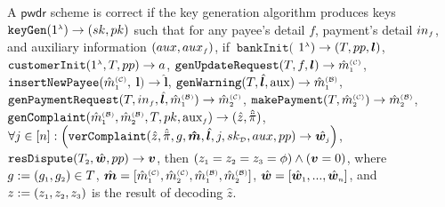 \begin{definition}[Correctness] A $\mathsf{pwdr}$ scheme is correct if the key generation algorithm produces keys $\mathtt{keyGen}(1^{\scriptscriptstyle \lambda})\rightarrow (sk,pk)$ such that for any payee's detail $f$, payment's detail $in_{\scriptscriptstyle f}$, and auxiliary information $(aux, aux_{\scriptscriptstyle f})$, if $\ \mathtt{bankInit}($ $1^{\scriptscriptstyle \lambda})\rightarrow (T, pp, \bm{l})$, $\mathtt{customerInit} (1^{\scriptscriptstyle \lambda}, T, pp)\rightarrow a$, $\mathtt{genUpdateRequest}(T, f, {\bm l})\rightarrow \hat m^{\scriptscriptstyle\mathcal{(C)}}_{\scriptscriptstyle 1}$, $\mathtt{insertNewPayee}(\hat{m}^{\scriptscriptstyle\mathcal{(C)}}_{\scriptscriptstyle 1}, $ ${\bm l})\rightarrow  \hat{\bm l}$, $\mathtt{genWarning}(T, \hat{\bm l}, \text{aux})\rightarrow \hat m^{\scriptscriptstyle\mathcal{(B)}}_{\scriptscriptstyle1}$, $\mathtt{genPaymentRequest}(T, in_{\scriptscriptstyle f}, \hat{\bm{l}}, \hat m^{\scriptscriptstyle\mathcal{(B)}}_{\scriptscriptstyle1})\rightarrow \hat m^{\scriptscriptstyle\mathcal{(C)}}_{\scriptscriptstyle2}$, $\mathtt{makePayment}(T, \hat m^{\scriptscriptstyle\mathcal{(C)}}_{\scriptscriptstyle2})\rightarrow \hat m^{\scriptscriptstyle\mathcal{(B)}}_{\scriptscriptstyle2}$, $\mathtt{genComplaint}(\hat m^{\scriptscriptstyle\mathcal{(B)}}_{\scriptscriptstyle 1}, \hat m^{\scriptscriptstyle\mathcal{(B)}}_{\scriptscriptstyle2}, T, pk, \text{aux}_{\scriptscriptstyle f})\rightarrow (\hat z, \hat{\ddot \pi})$, 
$\forall j\in [n]: \Big(\mathtt{verComplaint}( \hat z, \hat{\ddot{\pi}}, g, \bm{\hat{m}}, \hat{\bm{l}}, j, sk_{\scriptscriptstyle\mathcal D}, aux, pp)\rightarrow \hat{\bm{w}_{\scriptscriptstyle j}}\Big)$, 
 $\mathtt{resDispute}(T_{\scriptscriptstyle 2}, \hat {\bm w}, pp)\rightarrow {\bm v}$, then $(z_{\scriptscriptstyle 1}=z_{\scriptscriptstyle 2}=z_{\scriptscriptstyle 3}=\phi) \wedge({\bm{v}}=0)$, where $g:=(g_{\scriptscriptstyle 1}, g_{\scriptscriptstyle 2})\in T$,   $\hat {\bm m}=[\hat {m}^{\scriptscriptstyle (\mathcal{C})}_{\scriptscriptstyle 1}, \hat {m}^{\scriptscriptstyle (\mathcal{C})}_{\scriptscriptstyle 2}, \hat {m}^{\scriptscriptstyle (\mathcal{B})}_{\scriptscriptstyle 1}, \hat {m}^{\scriptscriptstyle (\mathcal{B})}_{\scriptscriptstyle 2}]$,   $\hat {\bm w}=[{\hat{\bm w}}_{\scriptscriptstyle 1},...,{\hat{\bm w}}_{\scriptscriptstyle n}]$,  and $z:=(z_{\scriptscriptstyle 1}, z_{\scriptscriptstyle 2}, z_{\scriptscriptstyle 3})$ is the result of  decoding  $\hat{z}$.
\end{definition}





